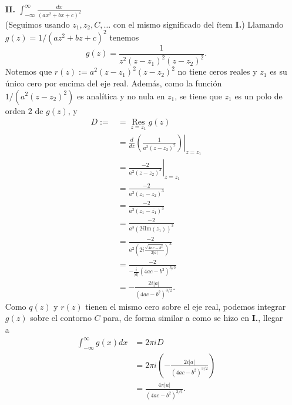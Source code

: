 {\begin{itemize}
$$\begin{aligned}
         \end{aligned}
         $$
         y por tanto
         $$
         \begin{aligned}
            \int_{-\infty}^{\infty}f(x)dx&=2\pi i B\\
                                         &=2\pi i\cdot\sgn(a)\frac{1}{i\sqrt{4ac-b^2}}\\
                                         &=\sgn(a)\frac{2\pi}{\sqrt{4ac-b^2}}.
         \end{aligned}
         $$
      \item[\textbf{II.}] $\int_{-\infty}^{\infty} \frac{dx}{(ax^2+bx+c)^2}$\\
         (Seguimos usando $z_1,z_2,C,\dots$ con el mismo significado del ítem \textbf{I.}) Llamando $g(z)=1/(az^2+bz+c)^2$ tenemos
         $$
         g(z)=\frac{1}{z^2(z-z_1)^2(z-z_2)^2}.
         $$
         Notemos que $r(z):=a^2(z-z_1)^2(z-z_2)^2$ no tiene ceros reales y $z_1$ es su único cero por encima del eje real. Además, como la función $1/(a^2(z-z_2)^2)$ es analítica y no nula en $z_1$, se tiene que $z_1$ es un polo de orden $2$ de $g(z)$, y
         $$
         \begin{aligned}
            D:=&=\mathop{\mathrm{Res}}\limits_{z=z_1}g(z)\\
               &=\frac{d}{dz}\left.\left( \frac{1}{a^2(z-z_2)^2}\right)\right|_{z=z_1}\\
               &=\left. \frac{-2}{a^2(z-z_2)^3}\right|_{z=z_1}\\
               &=\frac{-2}{a^2(z_1-z_2)^3}\\
               &=\frac{-2}{a^2(z_1-\overline{z_1})^3}\\
               &=\frac{-2}{a^2\left( 2i\text{Im}(z_1)\right)^3}\\
               &=\frac{-2}{a^2\left( 2i\frac{\sqrt{4ac-b^2}}{2|a|}\right)^3}\\
               &=\frac{-2}{-\frac{i}{|a|}(4ac-b^2)^{3/2}}\\
               &=-\frac{2i|a|}{(4ac-b^2)^{3/2}}.
         \end{aligned}
         $$
         Como $q(z)$ y $r(z)$ tienen el mismo cero sobre el eje real, podemos integrar $g(z)$ sobre el contorno $C$ para, de forma similar a como se hizo en \textbf{I.}, llegar a
         $$
         \begin{aligned}
            \int_{-\infty}^{\infty}g(x)dx&=2\pi i D\\
                                         &=2\pi i\left( -\frac{2i|a|}{(4ac-b^2)^{3/2}}\right)\\
                                         &=\frac{4\pi|a|}{(4ac-b^2)^{3/2}}.
         \end{aligned}
         $$
   \end{itemize}
  }
\hfill\qedsymbol
